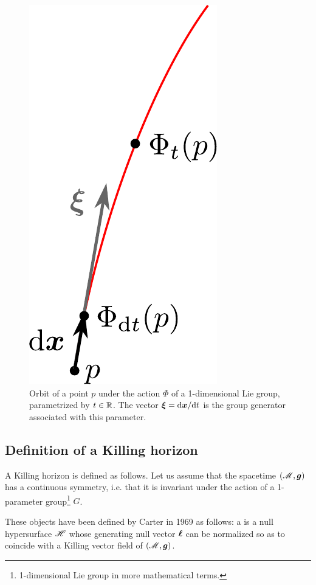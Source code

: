 {{\begin{figure}
\centerline{\includegraphics[height=0.25\textheight]{def_orbit_group.pdf}}
\caption[]{\label{f:def:orbit_group} \footnotesize
Orbit of a point $p$ under the action $\Phi$ of a 1-dimensional Lie group, parametrized
by $t\in\mathbb{R}$. The vector $\bm{\xi} = \mathrm{d}\bm{x}/\mathrm{d} t$ is the group
generator associated with this parameter.}
\end{figure}




\subsection{Definition of a Killing horizon} \label{s:def:def_Killing_hor}


A Killing horizon is defined as follows. Let us assume that the spacetime
$(\mathscr{M},\bm{g})$ has a continuous symmetry, i.e. that it is invariant under
the action of a 1-parameter group\footnote{1-dimensional Lie group in more mathematical
terms.} $G$.

These objects have
been defined by Carter in 1969 \cite{Carte69} as follows: a
 is
a null hypersurface $\mathscr{H}$ whose generating null vector $\bm{\ell}$ can be normalized
so as to coincide with a Killing vector field of $(\mathscr{M},\bm{g})$.

}}
